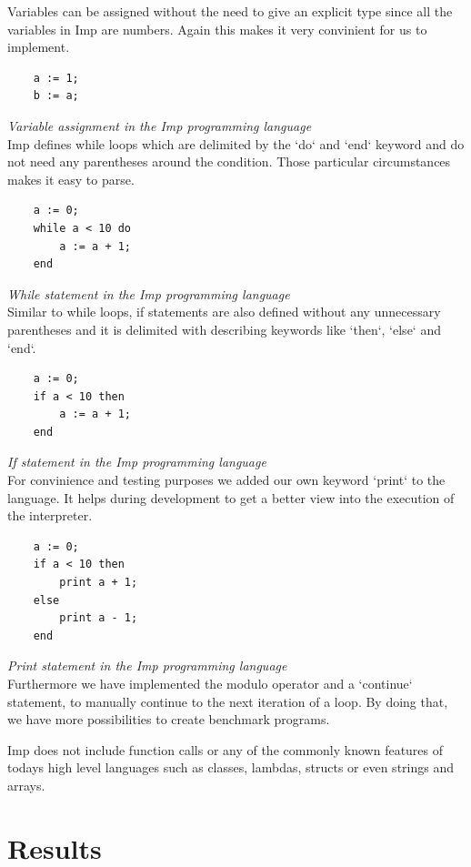 \documentclass{article}
\begin{document}
Variables can be assigned without the need to give an explicit type since all
the variables in Imp are numbers. Again this makes it very convinient for us to
implement.

\begin{verbatim}
    a := 1;
    b := a;
\end{verbatim}
\textit{Variable assignment in the Imp programming language} \\

Imp defines while loops which are delimited by the `do` and `end` keyword and
do not need any parentheses around the condition. Those particular circumstances
makes it easy to parse.

\begin{verbatim}
    a := 0;
    while a < 10 do
        a := a + 1;
    end
\end{verbatim}
\textit{While statement in the Imp programming language} \\

Similar to while loops, if statements are also defined without any unnecessary
parentheses and it is delimited with describing keywords like `then`, `else`
and `end`.

\begin{verbatim}
    a := 0;
    if a < 10 then
        a := a + 1;
    end
\end{verbatim}
\textit{If statement in the Imp programming language} \\

For convinience and testing purposes we added our own keyword `print` to the
language. It helps during development to get a better view into the execution
of the interpreter.

\begin{verbatim}
    a := 0;
    if a < 10 then
        print a + 1;
    else
        print a - 1;
    end
\end{verbatim}
\textit{Print statement in the Imp programming language} \\

Furthermore we have implemented the modulo operator and a `continue` statement,
to manually continue to the next iteration of a loop. By doing that, we have
more possibilities to create benchmark programs.

Imp does not include function calls or any of the commonly known features of
todays high level languages such as classes, lambdas, structs or even strings
and arrays.

\section{Results}
\end{document}
